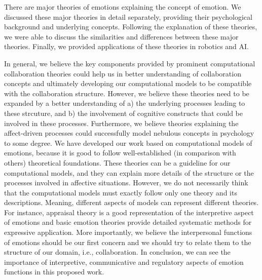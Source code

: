 \documentclass[12pt]{report}
\begin{document}
There are major theories of emotions explaining the concept of emotion. We
discussed these major theories in detail separately, providing their
psychological background and underlying concepts. Following the explanation of
these theories, we were able to discuss the similarities and differences between
these major theories. Finally, we provided applications of these theories in
robotics and AI.

{\color{red}In general, we believe the key components provided by prominent
computational collaboration theories could help us in better understanding of
collaboration concepts and ultimately developing our computational models to
be compatible with the collaboration structure. However, we believe these
theories need to be expanded by a better understanding of a) the underlying
processes leading to these strcuture, and b) the involvement of cognitive
constructs that could be involved in these processes. Furthermore, we believe
theories explaining the affect-driven processes could successfully model
nebulous concepts in psychology to some degree.}
We have developed our work based on computational models of emotions, because it
is good to follow well-established (in comparison with others) theoretical
foundations. These theories can be a guideline for our computational models, and
they can explain more details of the structure or the processes involved in
affective situations. However, we do not necessarily think that the
computational models must exactly follow only one theory and its descriptions.
Meaning, different aspects of models can represent different theories. For
instance, appraisal theory is a good representation of the interpretive aspect
of emotions and basic emotion theories provide detailed systematic methods for
expressive application. More importantly, we believe the interpersonal functions
of emotions should be our first concern and we should try to relate them to the
structure of our domain, i.e., collaboration. In conclusion, we can see the
importance of interpretive, communicative and regulatory aspects of emotion
functions in this proposed work.
\end{document}
